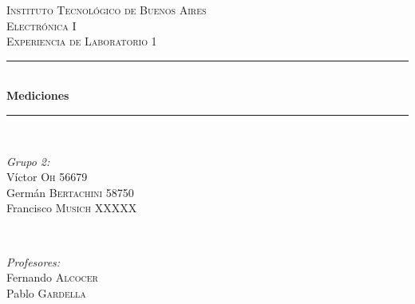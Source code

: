 \begin{titlepage}
    \newcommand{\HRule}{\rule{\linewidth}{0.5mm}}
    \center
    \textsc{\LARGE Instituto Tecnológico de Buenos Aires}\\[1.2cm]
    \textsc{\Large Electrónica I}\\[0.5cm]
    \textsc{\large Experiencia de Laboratorio 1}\\[0.5cm]
    
    \HRule \\[0.4cm]
    { \huge \bfseries  Mediciones}\\[0.4cm] %
    \HRule \\[1.5cm]
    
    
    \begin{minipage}{0.4\textwidth}
    \begin{flushleft} \large
    \emph{Grupo 2:}\\
    Víctor \textsc{Oh} 56679\\
    Germán \textsc{Bertachini}  58750\\
    Francisco \textsc{Musich} XXXXX\\
    \end{flushleft}
    \end{minipage}
    ~
    \begin{minipage}{0.4\textwidth}
    \begin{flushright} \large
    \emph{Profesores:} \\
    Fernando \textsc{Alcocer}\\
    Pablo \textsc{Gardella}\\
    \end{flushright}
    \end{minipage}\\[4cm]
    
    \vfill %
\end{titlepage}